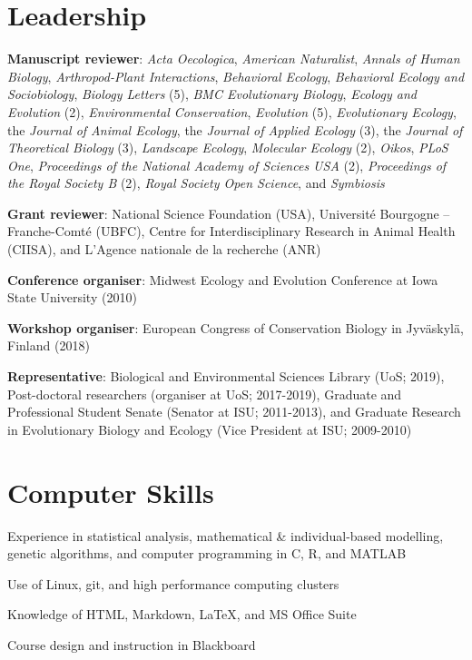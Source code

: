 \documentclass[letterpaper]{article}
\renewenvironment{itemize}{
  \begin{list}{}{
    \setlength{\leftmargin}{1.5em}
  }
}{
  \end{list}
}
\begin{document}
\section*{Leadership}
\begin{itemize}
\item {\bf Manuscript reviewer}: {\it Acta Oecologica}, {\it American Naturalist}, {\it Annals of Human Biology}, {\it Arthropod-Plant Interactions}, {\it Behavioral Ecology}, {\it Behavioral Ecology and Sociobiology}, {\it Biology Letters} (5), {\it BMC Evolutionary Biology}, {\it Ecology and Evolution} (2), {\it Environmental Conservation}, {\it Evolution} (5), {\it Evolutionary Ecology}, the {\it Journal of Animal Ecology}, the {\it Journal of Applied Ecology} (3), the {\it Journal of Theoretical Biology} (3), {\it Landscape Ecology}, {\it Molecular Ecology} (2), {\it Oikos}, {\it PLoS One}, {\it Proceedings of the National Academy of Sciences USA} (2), {\it Proceedings of the Royal Society B} (2), {\it Royal Society Open Science}, and {\it Symbiosis}
\item {\bf Grant reviewer}: National Science Foundation (USA), Universit\'{e} Bourgogne -- Franche-Comt\'{e} (UBFC), Centre for Interdisciplinary Research in Animal Health (CIISA), and L'Agence nationale de la recherche (ANR)
\item {\bf Conference organiser}: Midwest Ecology and Evolution Conference at Iowa State University (2010)
\item {\bf Workshop organiser}: European Congress of Conservation Biology in Jyv\"{a}skyl\"{a}, Finland (2018)
\item {\bf Representative}: Biological and Environmental Sciences Library (UoS; 2019), Post-doctoral researchers (organiser at UoS; 2017-2019), Graduate and Professional Student Senate (Senator at ISU; 2011-2013), and Graduate Research in Evolutionary Biology and Ecology (Vice President at ISU; 2009-2010)
\end{itemize}

\section*{Computer Skills}
\begin{itemize}
\item Experience in statistical analysis, mathematical \& individual-based modelling, genetic algorithms, and computer programming in C, R, and MATLAB
\item Use of Linux, git, and high performance computing clusters
\item Knowledge of HTML, Markdown, \LaTeX, and MS Office Suite
\item Course design and instruction in Blackboard %
\end{itemize}
\end{document}
